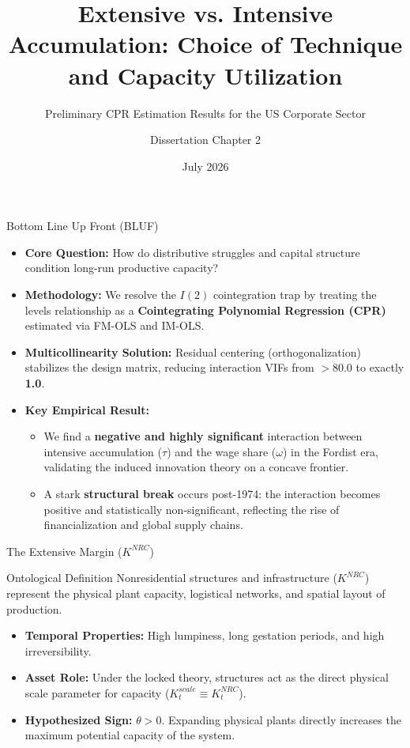 \documentclass[10pt]{beamer}
\title[Extensive vs. Intensive Accumulation]{Extensive vs. Intensive Accumulation: Choice of Technique and Capacity Utilization}
\subtitle{Preliminary CPR Estimation Results for the US Corporate Sector}
\author{Dissertation Chapter 2}
\institute[UMass Amherst]{Department of Economics \\ University of Massachusetts Amherst}
\date{July 2026}
\begin{document}
\begin{frame}
  \titlepage
\end{frame}

\begin{frame}{Bottom Line Up Front (BLUF)}
  \begin{itemize}
    \item \textbf{Core Question:} How do distributive struggles and capital structure condition long-run productive capacity?
    \item \textbf{Methodology:} We resolve the $I(2)$ cointegration trap by treating the levels relationship as a \textbf{Cointegrating Polynomial Regression (CPR)} estimated via FM-OLS and IM-OLS. 
    \item \textbf{Multicollinearity Solution:} Residual centering (orthogonalization) stabilizes the design matrix, reducing interaction VIFs from $>80.0$ to exactly \textbf{1.0}.
    \item \textbf{Key Empirical Result:} 
      \begin{itemize}
        \item We find a \textbf{negative and highly significant} interaction between intensive accumulation ($\tau$) and the wage share ($\omega$) in the Fordist era, validating the induced innovation theory on a concave frontier.
        \item A stark \textbf{structural break} occurs post-1974: the interaction becomes positive and statistically non-significant, reflecting the rise of financialization and global supply chains.
      \end{itemize}
  \end{itemize}
\end{frame}

\begin{frame}{The Extensive Margin ($K^{NRC}$)}
  \begin{block}{Ontological Definition}
    Nonresidential structures and infrastructure ($K^{NRC}$) represent the physical plant capacity, logistical networks, and spatial layout of production.
  \end{block}
  \begin{itemize}
    \item \textbf{Temporal Properties:} High lumpiness, long gestation periods, and high irreversibility.
    \item \textbf{Asset Role:} Under the locked theory, structures act as the direct physical scale parameter for capacity ($K_t^{scale} \equiv K_t^{NRC}$).
    \item \textbf{Hypothesized Sign:} $\theta > 0$. Expanding physical plants directly increases the maximum potential capacity of the system.
  \end{itemize}
\end{frame}
\end{document}
